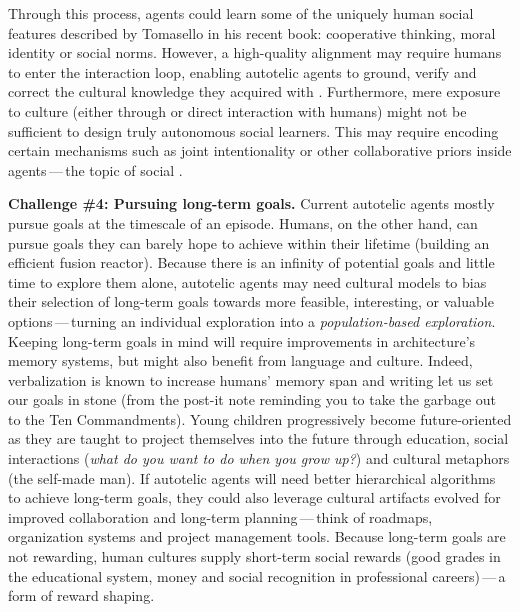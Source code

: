 Through this process, agents could learn some of the uniquely human social features described by Tomasello in his recent book\cite{Tomasello+2019}: cooperative thinking, moral identity or social norms. However, a high-quality alignment may require humans to enter the interaction loop, enabling autotelic agents to ground, verify and correct the cultural knowledge they acquired with \llms. Furthermore, mere exposure to culture (either through \llms or direct interaction with humans) might not be sufficient to design truly autonomous social learners. This may require encoding certain mechanisms such as joint intentionality or other collaborative priors inside agents\,---\,the topic of social \rl.\cite{jaques2019social}



\textbf{Challenge \#4: Pursuing long-term goals.} Current autotelic agents mostly pursue goals at the timescale of an episode. Humans, on the other hand, can pursue goals they can barely hope to achieve within their lifetime (\eg building an efficient fusion reactor). Because there is an infinity of potential goals and little time to explore them alone, autotelic agents may need cultural models to bias their selection of long-term goals towards more feasible, interesting, or valuable options\,---\,turning an individual exploration into a \textit{population-based exploration}.  Keeping long-term goals in mind will require improvements in architecture's memory systems, but might also benefit from language and culture. Indeed, verbalization is known to increase humans' memory span \cite{elliott_multilab_2021} and writing let us set our goals in stone (from the post-it note reminding you to take the garbage out to the Ten Commandments). Young children progressively become future-oriented as they are taught to project themselves into the future through education, social interactions (\textit{what do you want to do when you grow up?}) and cultural metaphors (\eg the self-made man).\cite{atance2008future} If autotelic agents will need better hierarchical \rl algorithms to achieve long-term goals, they could also leverage cultural artifacts evolved for improved collaboration and long-term planning\,---\,think of roadmaps, organization systems and
project management tools.\cite{carruthers_magic_1998} Because long-term goals are not rewarding, human cultures supply short-term social rewards (good grades in the educational system, money and social recognition in professional careers)\,---\,a form of reward shaping. 

